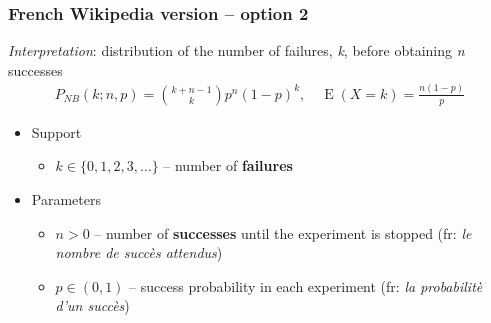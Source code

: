 \subsubsection*{French Wikipedia version -- option 2}
\textit{Interpretation}: distribution of the number of failures, \emph{k}, before obtaining \emph{n} successes
\begin{align*}
P_{N\!B}(k;n,p) = {k + n - 1 \choose k} p^n (1-p)^k, \quad \operatorname E(X\!=\!k)=\frac{n(1-p)}{p}
\end{align*}
\begin{itemize}
\item 
Support
\begin{itemize}
\item 
$k \in \{ 0, 1, 2, 3, \dots\}$ -- number of \textbf{failures}
\end{itemize}
\item 
Parameters 
\begin{itemize}
\item 
$n > 0$ -- number of \textbf{successes} until the experiment is stopped (fr: \emph{le nombre de succ\`es attendus})
\item 
$p \in (0,1)$ -- success probability in each experiment (fr: \emph{la probabilit\`e d'un succ\`es})
\end{itemize}
\end{itemize}

